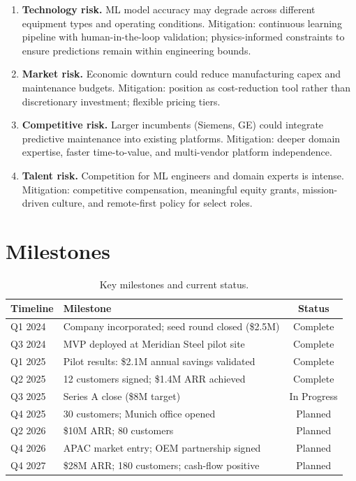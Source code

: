 \documentclass[
    language=english,
    doctype=business-plan,
    institution=none,
]{../../omnilatex}
\begin{document}
\begin{enumerate}
    \item \textbf{Technology risk.} ML model accuracy may degrade across
        different equipment types and operating conditions. Mitigation: continuous
        learning pipeline with human-in-the-loop validation; physics-informed
        constraints to ensure predictions remain within engineering bounds.
    \item \textbf{Market risk.} Economic downturn could reduce manufacturing
        capex and maintenance budgets. Mitigation: position as cost-reduction
        tool rather than discretionary investment; flexible pricing tiers.
    \item \textbf{Competitive risk.} Larger incumbents (Siemens, GE) could
        integrate predictive maintenance into existing platforms. Mitigation:
        deeper domain expertise, faster time-to-value, and multi-vendor
        platform independence.
    \item \textbf{Talent risk.} Competition for ML engineers and domain
        experts is intense. Mitigation: competitive compensation, meaningful
        equity grants, mission-driven culture, and remote-first policy for
        select roles.
\end{enumerate}

\section{Milestones}

\begin{table}[h]
    \centering
    \begin{tabular}{llc}
        \toprule
        \textbf{Timeline} & \textbf{Milestone} & \textbf{Status} \\
        \midrule
        Q1 2024  & Company incorporated; seed round closed (\$2.5M) & Complete \\
        Q3 2024  & MVP deployed at Meridian Steel pilot site & Complete \\
        Q1 2025  & Pilot results: \$2.1M annual savings validated & Complete \\
        Q2 2025  & 12 customers signed; \$1.4M ARR achieved & Complete \\
        Q3 2025  & Series A close (\$8M target) & In Progress \\
        Q4 2025  & 30 customers; Munich office opened & Planned \\
        Q2 2026  & \$10M ARR; 80 customers & Planned \\
        Q4 2026  & APAC market entry; OEM partnership signed & Planned \\
        Q4 2027  & \$28M ARR; 180 customers; cash-flow positive & Planned \\
        \bottomrule
    \end{tabular}
    \caption{Key milestones and current status.}
\end{table}

\printbibliography[heading=none]
\end{document}
